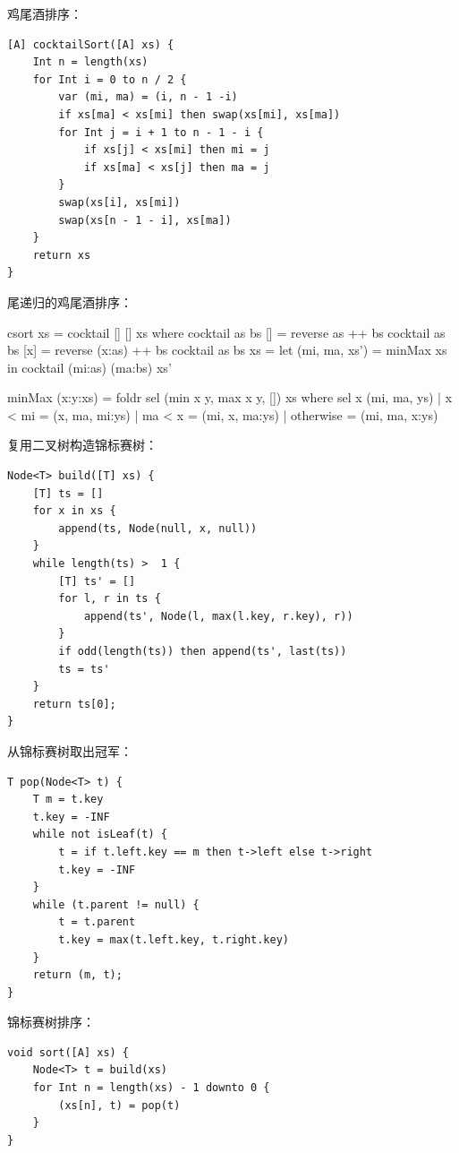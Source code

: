 \documentclass[b5paper]{ctexart}
\begin{document}
鸡尾酒排序：

\begin{lstlisting}[language = Bourbaki]
[A] cocktailSort([A] xs) {
    Int n = length(xs)
    for Int i = 0 to n / 2 {
        var (mi, ma) = (i, n - 1 -i)
        if xs[ma] < xs[mi] then swap(xs[mi], xs[ma])
        for Int j = i + 1 to n - 1 - i {
            if xs[j] < xs[mi] then mi = j
            if xs[ma] < xs[j] then ma = j
        }
        swap(xs[i], xs[mi])
        swap(xs[n - 1 - i], xs[ma])
    }
    return xs
}
\end{lstlisting}

尾递归的鸡尾酒排序：

\begin{Haskell}
csort xs = cocktail [] [] xs
  where
    cocktail as bs []  = reverse as ++ bs
    cocktail as bs [x] = reverse (x:as) ++ bs
    cocktail as bs xs  = let (mi, ma, xs') = minMax xs
                         in cocktail (mi:as) (ma:bs) xs'

minMax (x:y:xs) = foldr sel (min x y, max x y, []) xs
  where
    sel x (mi, ma, ys) | x < mi = (x, ma, mi:ys)
                       | ma < x = (mi, x, ma:ys)
                       | otherwise = (mi, ma, x:ys)
\end{Haskell}

复用二叉树构造锦标赛树：

\begin{lstlisting}[language = Bourbaki]
Node<T> build([T] xs) {
    [T] ts = []
    for x in xs {
        append(ts, Node(null, x, null))
    }
    while length(ts) >  1 {
        [T] ts' = []
        for l, r in ts {
            append(ts', Node(l, max(l.key, r.key), r))
        }
        if odd(length(ts)) then append(ts', last(ts))
        ts = ts'
    }
    return ts[0];
}
\end{lstlisting}

从锦标赛树取出冠军：

\begin{lstlisting}[language = Bourbaki]
T pop(Node<T> t) {
    T m = t.key
    t.key = -INF
    while not isLeaf(t) {
        t = if t.left.key == m then t->left else t->right
        t.key = -INF
    }
    while (t.parent != null) {
        t = t.parent
        t.key = max(t.left.key, t.right.key)
    }
    return (m, t);
}
\end{lstlisting}

锦标赛树排序：

\begin{lstlisting}[language = Bourbaki]
void sort([A] xs) {
    Node<T> t = build(xs)
    for Int n = length(xs) - 1 downto 0 {
        (xs[n], t) = pop(t)
    }
}
\end{lstlisting}
\end{document}
